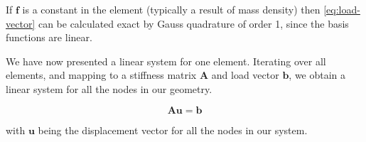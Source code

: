 If $\bm{f}$ is a constant in the element (typically a result of mass density) then \eqref{eq:load-vector} can be calculated exact by Gauss quadrature of order 1, since the basis functions are linear. 

We have now presented a linear system for one element. Iterating over all elements, and mapping to a stiffness matrix $\bm{A}$ and load vector $\bm{b}$, we obtain a linear system for all the nodes in our geometry. 

\begin{equation}
\bm{A} \bm{u} = \bm{b}
\end{equation}

with $\bm{u}$ being the displacement vector for all the nodes in our system. 